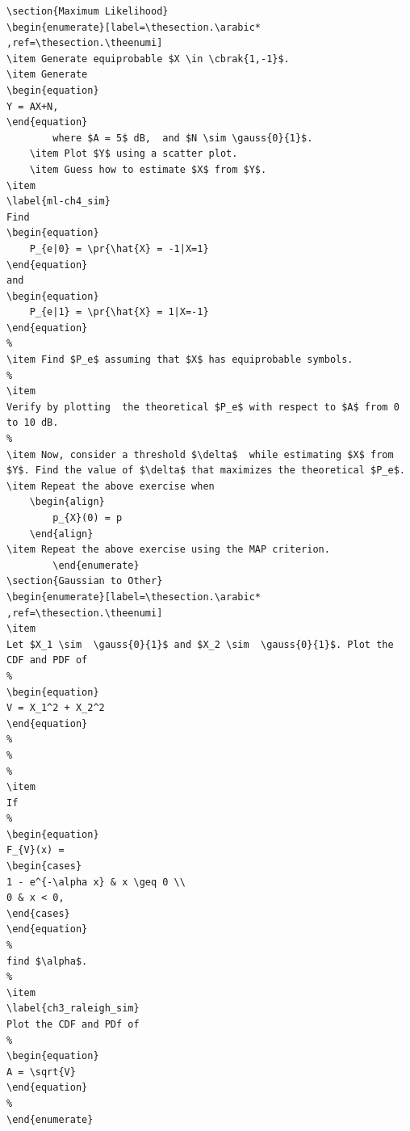 \documentclass[journal,12pt,twocolumn]{IEEEtran}
\renewcommand\thesection{\arabic{section}}
\begin{document}
\begin{enumerate}[label=\thesection.\arabic*,ref=\thesection.\theenumi]
\begin{enumerate}[label=\thesection.\arabic*
,ref=\thesection.\theenumi]
\begin{lstlisting}
\section{Maximum Likelihood}
\begin{enumerate}[label=\thesection.\arabic*
,ref=\thesection.\theenumi]
\item Generate equiprobable $X \in \cbrak{1,-1}$.
\item Generate
\begin{equation}
Y = AX+N,
\end{equation}
		where $A = 5$ dB,  and $N \sim \gauss{0}{1}$.
	\item Plot $Y$ using a scatter plot.
	\item Guess how to estimate $X$ from $Y$.
\item
\label{ml-ch4_sim}
Find
\begin{equation}
	P_{e|0} = \pr{\hat{X} = -1|X=1}
\end{equation}
and
\begin{equation}
	P_{e|1} = \pr{\hat{X} = 1|X=-1}
\end{equation}
%
\item Find $P_e$ assuming that $X$ has equiprobable symbols.
%
\item
Verify by plotting  the theoretical $P_e$ with respect to $A$ from 0 to 10 dB.
%
\item Now, consider a threshold $\delta$  while estimating $X$ from $Y$. Find the value of $\delta$ that maximizes the theoretical $P_e$.
\item Repeat the above exercise when
	\begin{align}
		p_{X}(0) = p
	\end{align}
\item Repeat the above exercise using the MAP criterion.
		\end{enumerate}
\section{Gaussian to Other}
\begin{enumerate}[label=\thesection.\arabic*
,ref=\thesection.\theenumi]
\item
Let $X_1 \sim  \gauss{0}{1}$ and $X_2 \sim  \gauss{0}{1}$. Plot the CDF and PDF of
%
\begin{equation}
V = X_1^2 + X_2^2
\end{equation}
%
%
%
\item
If
%
\begin{equation}
F_{V}(x) =
\begin{cases}
1 - e^{-\alpha x} & x \geq 0 \\
0 & x < 0,
\end{cases}
\end{equation}
%
find $\alpha$.
%
\item
\label{ch3_raleigh_sim}
Plot the CDF and PDf of
%
\begin{equation}
A = \sqrt{V}
\end{equation}
%
\end{enumerate}

\end{lstlisting}
\end{enumerate}
\end{enumerate}
\end{document}

